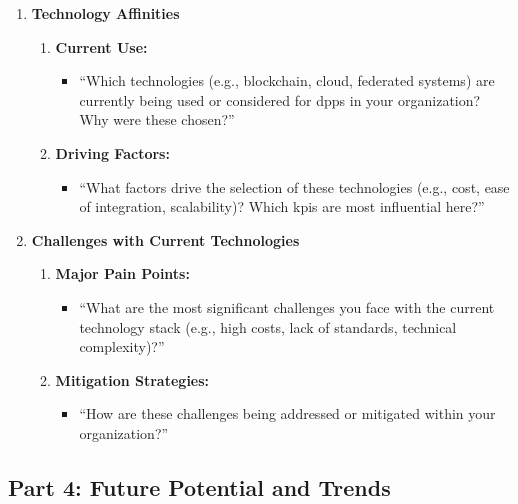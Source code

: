 \begin{enumerate}
    \item \textbf{Technology Affinities}
    \begin{enumerate}
        \item \textbf{Current Use:}
        \begin{itemize}
            \item ``Which technologies (e.g., blockchain, cloud, federated systems) are currently being used or considered for \ac{dpp}s in your organization? Why were these chosen?''
        \end{itemize}
        \item \textbf{Driving Factors:}
        \begin{itemize}
            \item ``What factors drive the selection of these technologies (e.g., cost, ease of integration, scalability)? Which \ac{kpi}s are most influential here?''
        \end{itemize}
    \end{enumerate}
    
    \item \textbf{Challenges with Current Technologies}
    \begin{enumerate}
        \item \textbf{Major Pain Points:}
        \begin{itemize}
            \item ``What are the most significant challenges you face with the current technology stack (e.g., high costs, lack of standards, technical complexity)?''
        \end{itemize}
        \item \textbf{Mitigation Strategies:}
        \begin{itemize}
            \item ``How are these challenges being addressed or mitigated within your organization?''
        \end{itemize}
    \end{enumerate}
\end{enumerate}

\subsection*{Part 4: Future Potential and Trends}

